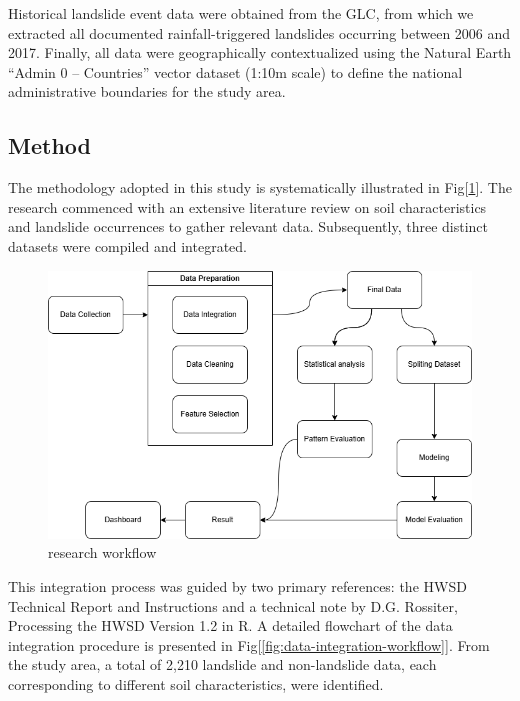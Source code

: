Historical landslide event data were obtained from the GLC, from which we extracted all documented rainfall-triggered landslides occurring between 2006 and 2017. Finally, all data were geographically contextualized using the Natural Earth “Admin 0 – Countries” vector dataset (1:10m scale) to define the national administrative boundaries for the study area.









\subsection{Method}

The methodology adopted in this study is systematically illustrated in Fig[\ref{fig:research-workflow}]. The research commenced with an extensive literature review on soil characteristics and landslide occurrences to gather relevant data. Subsequently, three distinct datasets were compiled and integrated.

\begin{figure}[htbp]
    \centerline{\includegraphics[width=\linewidth]{fig2.png}}
    \caption{research workflow}
    \label{fig:research-workflow}
\end{figure}
This integration process was guided by two primary references: the HWSD Technical Report and Instructions and a technical note by D.G. Rossiter, Processing the HWSD Version 1.2 in R. A detailed flowchart of the data integration procedure is presented in Fig[\ref{fig:data-integration-workflow}]. From the study area, a total of 2,210 landslide and non-landslide data, each corresponding to different soil characteristics, were identified.

